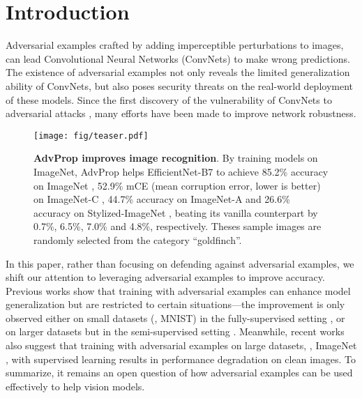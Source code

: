 \documentclass[10pt,twocolumn,letterpaper]{article}
\begin{document}
\section{Introduction}
Adversarial examples crafted by adding imperceptible perturbations to images, can lead Convolutional Neural Networks (ConvNets) to make wrong predictions. The existence of adversarial examples not only reveals the limited generalization ability of ConvNets, but also poses security threats on the real-world deployment of these models. Since the first discovery of the vulnerability of ConvNets to adversarial attacks \cite{Szegedy2014}, many efforts \cite{cheng2020cat,Goodfellow2015,jin2020manifold,Kannan2018,Kurakin2017,Madry2018,pang2020boosting,stutz2019confidence,Tramer2018,Xie2019,Zhang2019a} have been made to improve network robustness.


\begin{figure}[t!]
\centering
\texttt{[image: fig/teaser.pdf]}
\caption{\textbf{AdvProp improves image recognition}. By training models on ImageNet, AdvProp helps EfficientNet-B7 \cite{Tan2019} to achieve 85.2\% accuracy on ImageNet \cite{Russakovsky2015}, 52.9\% mCE (mean corruption error, lower is better) on ImageNet-C \cite{Hendrycks2018}, 44.7\% accuracy on ImageNet-A \cite{Hendrycks2019b} and 26.6\% accuracy on Stylized-ImageNet \cite{Geirhos2018}, beating its vanilla counterpart by 0.7\%, 6.5\%, 7.0\% and 4.8\%, respectively. Theses sample images are randomly selected from the category ``goldfinch''.}
\label{fig:teaser}
\vspace{-1em}
\end{figure}



In this paper, rather than focusing on defending against adversarial examples, we shift our attention to leveraging adversarial examples to improve accuracy. Previous works show that training with adversarial examples can enhance model generalization but are restricted to certain situations---the improvement is only observed either on small datasets (\eg, MNIST) in the fully-supervised setting \cite{Goodfellow2015,li2019inductive}, or on larger datasets but in the semi-supervised setting \cite{Miyato2018,Qiao2018}. Meanwhile, recent works \cite{Kurakin2017,Kannan2018,Xie2019} also suggest that training with adversarial examples on large datasets, \eg, ImageNet \cite{Russakovsky2015}, with supervised learning  results in performance degradation on clean images. To summarize, it remains an open question of how adversarial examples can be  used effectively to help vision models.
\end{document}
